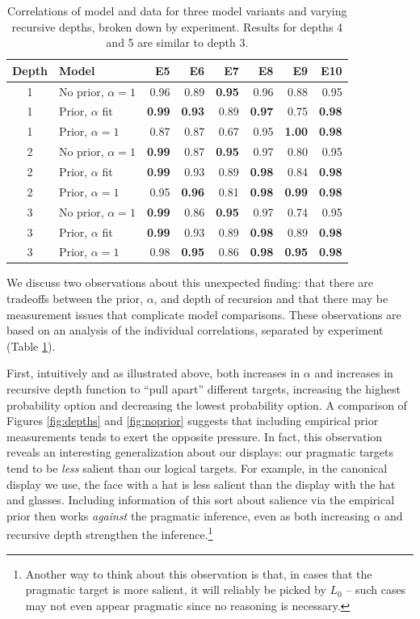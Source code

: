 \documentclass[man,noapacite]{apa2}
\begin{document}
\begin{table}[ht]
\centering
\begin{tabular}{clrrrrrr}
  \hline
Depth & Model & E5 & E6 & E7 & E8 & E9 & E10 \\
  \hline
  1 & No prior, $\alpha=1$ & 0.96 & 0.89 & {\bf 0.95} & 0.96 & 0.88 & 0.95 \\
    1 & Prior, $\alpha$ fit & {\bf 0.99} & {\bf 0.93} & 0.89 & {\bf 0.97} & 0.75 & {\bf 0.98} \\
    1 & Prior, $\alpha=1$ & 0.87 & 0.87 & 0.67 & 0.95 & {\bf 1.00} & {\bf 0.98} \\
  \hline
    2 & No prior, $\alpha=1$ & {\bf 0.99} & 0.87 & {\bf 0.95} & 0.97 & 0.80 & 0.95 \\
    2 & Prior, $\alpha$ fit & {\bf 0.99} & 0.93 & 0.89 & {\bf 0.98} & 0.84 & {\bf 0.98} \\
    2 & Prior, $\alpha=1$ & 0.95 & {\bf 0.96} & 0.81 & {\bf 0.98} & {\bf 0.99} & {\bf 0.98} \\
  \hline
    3 & No prior, $\alpha=1$ & {\bf 0.99} & 0.86 & {\bf 0.95} & 0.97 & 0.74 & 0.95 \\
    3 & Prior, $\alpha$ fit & {\bf 0.99} & 0.93 & 0.89 & {\bf 0.98} & 0.89 & {\bf 0.98} \\
    3 & Prior, $\alpha=1$ & 0.98 & {\bf 0.95} & 0.86 & {\bf 0.98} & {\bf 0.95} & {\bf 0.98} \\
  \hline
\end{tabular}
\caption{\label{tab:expts-corrs} Correlations of model and data for three model variants and varying recursive depths, broken down by experiment. Results for depths 4 and 5 are similar to depth 3.}
\end{table}

We discuss two observations about this unexpected finding: that there are tradeoffs between the prior, $\alpha$, and depth of recursion and that there may be measurement issues that complicate model comparisons. These observations are based on an analysis of the individual correlations, separated by experiment (Table \ref{tab:expts-corrs}).

First, intuitively and as illustrated above, both increases in $\alpha$ and increases in recursive depth function to ``pull apart'' different targets, increasing the highest probability option and decreasing the lowest probability option. A comparison of Figures \ref{fig:depths} and \ref{fig:noprior} suggests that including empirical prior measurements tends to exert the opposite pressure. In fact, this observation reveals an interesting generalization about our displays: our pragmatic targets tend to be \emph{less} salient than our logical targets. For example, in the canonical display we use, the face with a hat is less salient than the display with the hat and glasses. Including information of this sort about salience via the empirical prior then works \emph{against} the pragmatic inference, even as both increasing $\alpha$ and recursive depth strengthen the inference.\footnote{Another way to think about this observation is that, in cases that the pragmatic target is more salient, it will reliably be picked by $L_0$ -- such cases may not even appear pragmatic since no reasoning is necessary.}
\end{document}
